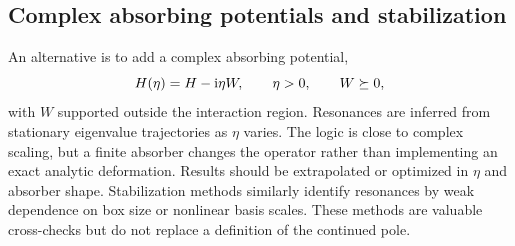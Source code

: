 \subsection{Complex absorbing potentials and stabilization}
\label{subsec:cap-stabilization}

An alternative is to add a complex absorbing potential,
\begin{equation}
  H(\eta)=H-\mathrm{i}\eta W,
  \qquad \eta>0,
  \qquad W\succeq0,
  \label{eq:cap}
\end{equation}
with $W$ supported outside the interaction region.  Resonances are inferred
from stationary eigenvalue trajectories as $\eta$ varies.  The logic is close
to complex scaling, but a finite absorber changes the operator rather than
implementing an exact analytic deformation.  Results should be extrapolated
or optimized in $\eta$ and absorber shape.  Stabilization methods similarly
identify resonances by weak dependence on box size or nonlinear basis scales.
These methods are valuable cross-checks but do not replace a definition of
the continued pole.
